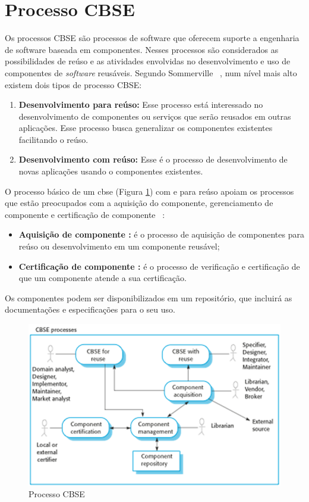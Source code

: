 \section{Processo CBSE}
Os processos CBSE são processos de software que oferecem suporte a engenharia de software baseada em componentes. Nesses processos são considerados as possibilidades de reúso e as atividades envolvidas no desenvolvimento e uso de componentes de \textit{software} reusáveis.
Segundo Sommerville ~\cite{sommerville2011}, num nível mais alto existem dois tipos de processo CBSE:
	\begin{enumerate}
		\item \textbf{Desenvolvimento para reúso:} Esse processo está interessado no desenvolvimento de componentes ou serviços que serão reusados em outras aplicações. Esse processo busca generalizar os componentes existentes facilitando o reúso.
		\item \textbf{Desenvolvimento com reúso:} Esse é o processo de desenvolvimento de novas aplicações usando o componentes existentes.
	\end{enumerate}  

O processo básico de um \ac{cbse} (Figura \ref{fig:process-cbse}) com e para reúso apoiam os processos que estão preocupados com a aquisição do componente, gerenciamento de componente e certificação de componente ~\cite{sommerville2011}:

\begin{itemize}
	\item \textbf{Aquisição de componente :} é o processo de aquisição de componentes para reúso ou desenvolvimento em um componente reusável;
	\item \textbf{Certificação de componente :} é o processo de verificação e certificação de que um componente atende a sua certificação.
\end{itemize}

Os componentes podem ser disponibilizados em um repositório, que incluirá as documentações e especificações para o seu uso.

\begin{figure}
 \centering
 \includegraphics[scale=0.8]{./img/cbse-kot.png}
\caption{Processo CBSE}
 \label{fig:process-cbse}
\end{figure}

